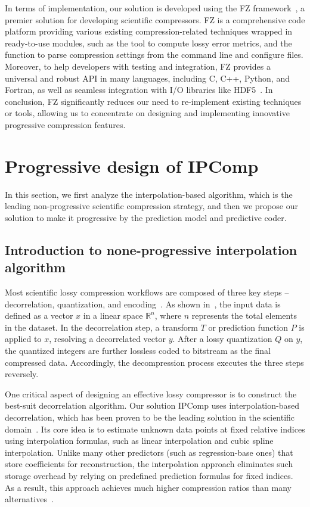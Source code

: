 In terms of implementation, our solution is developed using the FZ framework~\cite{fz}, a premier solution for developing scientific compressors.
FZ is a comprehensive code platform providing various existing compression-related techniques wrapped in ready-to-use modules, such as the tool to compute lossy error metrics, and the function to parse compression settings from the command line and configure files. Moreover, to help developers with testing and integration, FZ provides a universal and robust API in many languages, including C, C++, Python, and Fortran, as well as seamless integration with I/O libraries like HDF5~\cite{hdf5}. 
In conclusion, FZ significantly reduces our need to re-implement existing techniques or tools, allowing us to concentrate on designing and implementing innovative progressive compression features.





\section{Progressive design of IPComp}
\label{sec:design}
In this section, we first analyze the interpolation-based algorithm, which is the leading non-progressive scientific compression strategy, and then we propose our solution to make it progressive by the prediction model and predictive coder.


\subsection{Introduction to none-progressive interpolation algorithm}
\label{sec:design intro-to-interp}

Most scientific lossy compression workflows are composed of three key steps -- decorrelation, quantization, and encoding~\cite{interp, zfp, sperr, mgard}. As shown in~, the input data is defined as a vector $x$ in a linear space $\mathbb{R}^n$, where $n$ represents the total elements in the dataset. In the decorrelation step, a transform $T$ or prediction function $P$ is applied to $x$, resolving a decorrelated vector $y$. After a lossy quantization $Q$ on $y$, the quantized integers are further lossless coded to bitstream as the final compressed data. Accordingly, the decompression process executes the three steps reversely.

One critical aspect of designing an effective lossy compressor is to construct the best-suit decorrelation algorithm. Our solution IPComp uses interpolation-based decorrelation, which has been proven to be the leading solution in the scientific domain~\cite{interp, qoz, qoz2, mgard}. Its core idea is to estimate unknown data points at fixed relative indices using interpolation formulas, such as linear interpolation and cubic spline interpolation. Unlike many other predictors (such as regression-base ones) that store coefficients for reconstruction, the interpolation approach eliminates such storage overhead by relying on predefined prediction formulas for fixed indices. As a result, this approach achieves much higher compression ratios than many alternatives~\cite{interp}. 

